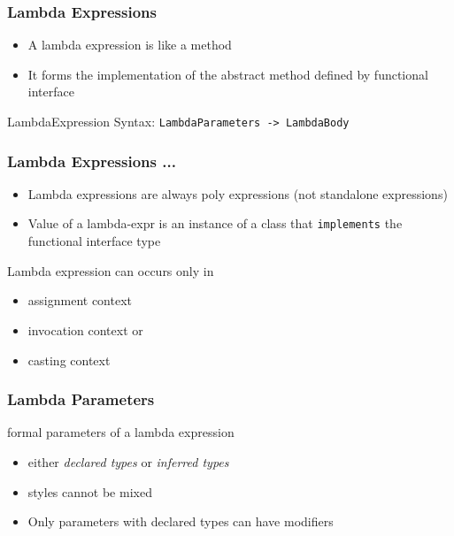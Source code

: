 \documentclass{beamer}
\begin{document}
\begin{frame}[fragile]
    \frametitle{Lambda Expressions}

\begin{itemize}
  \item A lambda expression is like a method
  \item It forms the implementation of the abstract method defined by functional interface
\end{itemize}

\begin{block} {LambdaExpression Syntax:}
    \texttt{LambdaParameters -> LambdaBody}
\end{block}

\end{frame}


\begin{frame}[fragile]
    \frametitle{Lambda Expressions ...}

\begin{itemize}
   \item <1-> Lambda expressions are always poly expressions (not standalone expressions)
   \item <2-> Value of a lambda-expr is an instance of a class 
              that \texttt{implements} the functional interface type
\end{itemize}

\begin{block} {Lambda expression can occurs only in}
  \begin{itemize}
  \item assignment context
  \item invocation context or
  \item casting context
  \end{itemize}
\end{block}

\end{frame}


\begin{frame}[fragile]
    \frametitle{Lambda Parameters}
\begin{block}{formal parameters of a lambda expression}
\begin{itemize} 
\item either \textit{declared types} or \textit{inferred types}
\item styles cannot be mixed
\item Only parameters with declared types can have modifiers
\end{itemize}
\end{block}
\end{frame}
\end{document}

